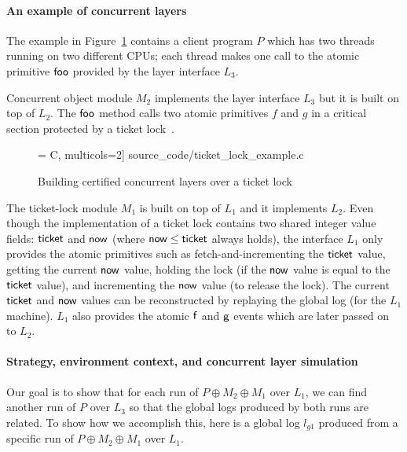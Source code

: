 \paragraph{An example of concurrent layers}
The example in Figure~\ref{fig:exp:ticket_lock_example} contains a
client program $P$ which has two threads running on two different
CPUs; each thread makes one call to the atomic primitive $\mathsf{foo}$
provided by the layer interface $L_3$.

Concurrent object module $M_2$ implements the layer interface $L_3$
but it is built on top of $L_2$.  The $\mathsf{foo}$ method calls two
atomic primitives $f$ and $g$ in a critical section protected by a
ticket lock~\cite{mcs91}.

\begin{figure}
 = C, multicols=2] {source_code/ticket_lock_example.c}
\caption{Building certified concurrent layers over a ticket lock}
\label{fig:exp:ticket_lock_example}
\end{figure}

The ticket-lock module $M_1$ is built on top of $L_1$ and it
implements $L_2$. Even though the implementation of a ticket lock
contains two shared integer value fields: $\mathsf{ticket}$ and
$\mathsf{now}$ (where $\mathsf{now} \leq \mathsf{ticket}$ always holds), the
interface $L_1$ only provides the atomic primitives such as
fetch-and-incrementing the $\mathsf{ticket}$ value, getting the current
$\mathsf{now}$ value, holding the lock (if the $\mathsf{now}$ value is
equal to the $\mathsf{ticket}$ value), and incrementing the $\mathsf{now}$
value (to release the lock). The current $\mathsf{ticket}$ and
$\mathsf{now}$ values can be reconstructed by replaying the global log
(for the $L_1$ machine).  $L_1$ also provides the atomic $\mathsf{f}$
and $\mathsf{g}$ events which are later passed on to $L_2$.

\paragraph{Strategy, environment context, and concurrent layer simulation}
Our goal is to show that for each run of $P\oplus{}M_2\oplus{}M_1$
over $L_1$, we can find another run of $P$ over $L_3$ so that the
global logs produced by both runs are related.
To show how we accomplish this, here is
a global log $l_{g1}$ produced from  
a specific run of $P\oplus{}M_2\oplus{}M_1$ over $L_1$.

